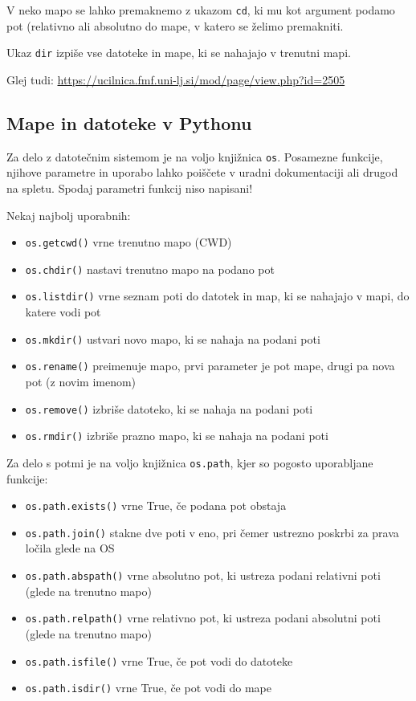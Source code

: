\documentclass[
]{report}
\providecommand{\tightlist}{%
  \setlength{\itemsep}{0pt}\setlength{\parskip}{0pt}}
\begin{document}
V neko mapo se lahko premaknemo z ukazom \texttt{cd}, ki mu kot argument podamo pot
(relativno ali absolutno do mape, v katero se želimo premakniti.

Ukaz \texttt{dir} izpiše vse datoteke in mape, ki se nahajajo v trenutni mapi.

Glej tudi: \url{https://ucilnica.fmf.uni-lj.si/mod/page/view.php?id=2505}

\hypertarget{mape-in-datoteke-v-pythonu}{%
\subsection{Mape in datoteke v Pythonu}\label{mape-in-datoteke-v-pythonu}}

Za delo z datotečnim sistemom je na voljo knjižnica \texttt{os}.
Posamezne funkcije, njihove parametre in uporabo lahko poiščete v uradni
dokumentaciji ali drugod na spletu. Spodaj parametri funkcij niso napisani!

Nekaj najbolj uporabnih:

\begin{itemize}
\tightlist
\item
  \texttt{os.getcwd()} vrne trenutno mapo (CWD)
\item
  \texttt{os.chdir()} nastavi trenutno mapo na podano pot
\item
  \texttt{os.listdir()} vrne seznam poti do datotek in map, ki se nahajajo v mapi, do katere vodi pot
\item
  \texttt{os.mkdir()} ustvari novo mapo, ki se nahaja na podani poti
\item
  \texttt{os.rename()} preimenuje mapo, prvi parameter je pot mape, drugi pa nova pot (z novim imenom)
\item
  \texttt{os.remove()} izbriše datoteko, ki se nahaja na podani poti
\item
  \texttt{os.rmdir()} izbriše prazno mapo, ki se nahaja na podani poti
\end{itemize}

Za delo s potmi je na voljo knjižnica \texttt{os.path}, kjer so pogosto uporabljane funkcije:

\begin{itemize}
\tightlist
\item
  \texttt{os.path.exists()} vrne True, če podana pot obstaja
\item
  \texttt{os.path.join()} stakne dve poti v eno, pri čemer ustrezno poskrbi za prava ločila glede na OS
\item
  \texttt{os.path.abspath()} vrne absolutno pot, ki ustreza podani relativni poti (glede na trenutno mapo)
\item
  \texttt{os.path.relpath()} vrne relativno pot, ki ustreza podani absolutni poti (glede na trenutno mapo)
\item
  \texttt{os.path.isfile()} vrne True, če pot vodi do datoteke
\item
  \texttt{os.path.isdir()} vrne True, če pot vodi do mape
\end{itemize}
\end{document}
